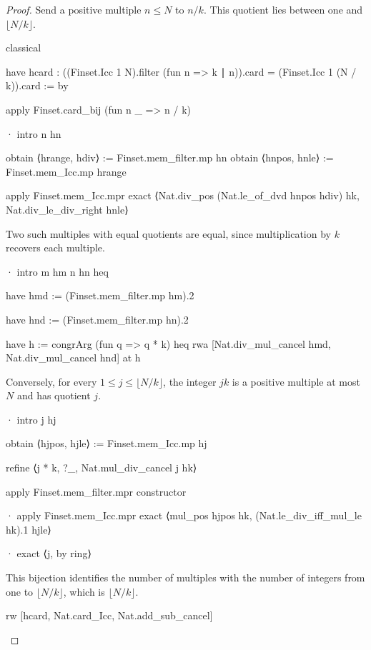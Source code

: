\begin{proof}
  Send a positive multiple $n\le N$ to $n/k$.
  This quotient lies between one and $\lfloor N/k\rfloor$.

  \begin{lean}
    classical

    have hcard : ((Finset.Icc 1 N).filter (fun n => k ∣ n)).card =
        (Finset.Icc 1 (N / k)).card := by

      apply Finset.card_bij (fun n _ => n / k)

      · intro n hn

        obtain ⟨hrange, hdiv⟩ := Finset.mem_filter.mp hn
        obtain ⟨hnpos, hnle⟩ := Finset.mem_Icc.mp hrange

        apply Finset.mem_Icc.mpr
        exact ⟨Nat.div_pos (Nat.le_of_dvd hnpos hdiv) hk, Nat.div_le_div_right hnle⟩
  \end{lean}

  Two such multiples with equal quotients are equal, since multiplication by $k$ recovers each
  multiple.

  \begin{lean}
    · intro m hm n hn heq

      have hmd := (Finset.mem_filter.mp hm).2

      have hnd := (Finset.mem_filter.mp hn).2

      have h := congrArg (fun q => q * k) heq
      rwa [Nat.div_mul_cancel hmd, Nat.div_mul_cancel hnd] at h
  \end{lean}

  Conversely, for every $1\le j\le\lfloor N/k\rfloor$, the integer $jk$ is a positive multiple at
  most $N$ and has quotient $j$.

  \begin{lean}
    · intro j hj

      obtain ⟨hjpos, hjle⟩ := Finset.mem_Icc.mp hj

      refine ⟨j * k, ?_, Nat.mul_div_cancel j hk⟩

      apply Finset.mem_filter.mpr
      constructor

      · apply Finset.mem_Icc.mpr
        exact ⟨mul_pos hjpos hk, (Nat.le_div_iff_mul_le hk).1 hjle⟩

      · exact ⟨j, by ring⟩
  \end{lean}

  This bijection identifies the number of multiples with the number of integers from one to
  $\lfloor N/k\rfloor$, which is $\lfloor N/k\rfloor$.

  \begin{lean}
    rw [hcard, Nat.card_Icc, Nat.add_sub_cancel]
  \end{lean}
\end{proof}

